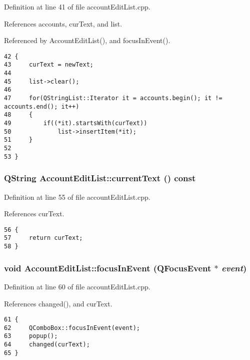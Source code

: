 Definition at line 41 of file account\-Edit\-List.cpp.

References accounts, cur\-Text, and list.

Referenced by Account\-Edit\-List(), and focus\-In\-Event().

\footnotesize\begin{verbatim}42 {
43     curText = newText;
44 
45     list->clear();
46 
47     for(QStringList::Iterator it = accounts.begin(); it != accounts.end(); it++)
48     {
49         if((*it).startsWith(curText))
50             list->insertItem(*it);
51     }
52 
53 }
\end{verbatim}\normalsize 


\hypertarget{classAccountEditList_a1}{
\subsubsection[currentText]{\setlength{\rightskip}{0pt plus 5cm}QString Account\-Edit\-List::current\-Text () const}}
\label{classAccountEditList_a1}


Definition at line 55 of file account\-Edit\-List.cpp.

References cur\-Text.

\footnotesize\begin{verbatim}56 {
57     return curText;
58 }
\end{verbatim}\normalsize 


\hypertarget{classAccountEditList_a3}{
\subsubsection[focusInEvent]{\setlength{\rightskip}{0pt plus 5cm}void Account\-Edit\-List::focus\-In\-Event (QFocus\-Event $\ast$ {\em event})}}
\label{classAccountEditList_a3}


Definition at line 60 of file account\-Edit\-List.cpp.

References changed(), and cur\-Text.

\footnotesize\begin{verbatim}61 {
62     QComboBox::focusInEvent(event);
63     popup();
64     changed(curText);
65 }
\end{verbatim}\normalsize 


